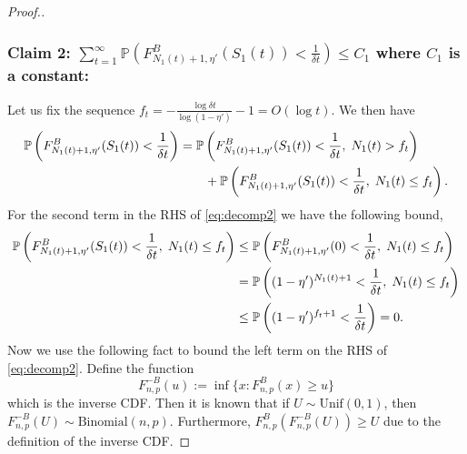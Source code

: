\begin{proof}[Proof.]
	\subsubsection*{Claim 2: $ \sum_{t=1}^\infty \mathbb{P}\left(F^B_{N_1(t)+1, \eta'}(S_1(t)) < \frac{1}{\delta t}\right) \le C_1$ where $C_1$ is a constant:}
	Let us fix the sequence $f_t = -\frac{\log \delta t }{\log (1-\eta')}-1 = O(\log t)$. We then have
	\begin{align}
	\P{F^B_{N_1(t)+1, \eta'}(S_1(t)) < \frac{1}{\delta t}} & = \P{F^B_{N_1(t)+1, \eta'}(S_1(t)) < \frac{1}{\delta t}, \; N_1(t) > f_t}  \nonumber \\
	& \qquad + \P{F^B_{N_1(t)+1, \eta'}(S_1(t)) < \frac{1}{\delta t}, \; N_1(t) \le f_t} \label{eq:decomp2}.
	\end{align}
	For the second term in the RHS of \eqref{eq:decomp2} we have the following bound,
	\begin{align}
	\P{F^B_{N_1(t)+1, \eta'}(S_1(t)) < \frac{1}{\delta t}, \; N_1(t) \le f_t}  &  \le \P{F^B_{N_1(t)+1,\eta'}(0) < \frac{1}{\delta  t}, \; N_1(t) \le f_t} \nonumber \\
	& = \P{(1-\eta')^{N_1(t)+1} <  \frac{1}{\delta  t}, \; N_1(t) \le f_t} \nonumber \\
	& \le \P{(1-\eta')^{f_t+1} <  \frac{1}{\delta  t}} = 0.\label{bound:bdd_by_zero}
	\end{align}
	Now we use the following fact to bound the left term on the RHS of \eqref{eq:decomp2}. Define the function
	\[
	F^{-B}_{n,p}(u) := \inf\{x : F^B_{n,p}(x) \ge u\}
	\]
	which is the inverse CDF. Then it is known that if $U \sim \text{Unif}(0,1)$, then $F^{-B}_{n,p}(U) \sim \text{Binomial}(n,p)$. Furthermore, $F^B_{n,p}(F^{-B}_{n,p}(U)) \ge U$ due to the definition of the inverse CDF.
	

\end{proof}
